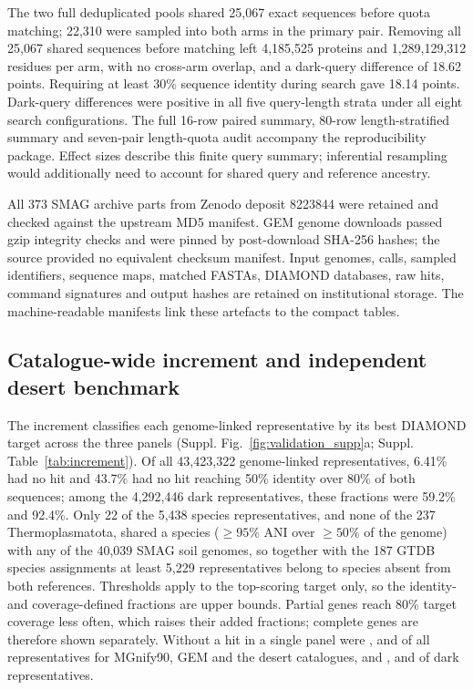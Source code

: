 The two full deduplicated pools shared 25{,}067 exact sequences before quota matching;
22{,}310 were sampled into both arms in the primary pair. Removing all 25{,}067 shared sequences
before matching left 4{,}185{,}525 proteins and 1{,}289{,}129{,}312 residues per arm, with no
cross-arm overlap, and a dark-query difference of 18.62 points. Requiring at least 30\%
sequence identity during search gave 18.14 points. Dark-query differences were positive in
all five query-length strata under all eight search configurations. The full 16-row paired
summary, 80-row length-stratified summary and seven-pair length-quota audit accompany the
reproducibility package. Effect sizes describe this finite query summary; inferential
resampling would additionally need to account for shared query and reference ancestry.

All 373 SMAG archive parts from Zenodo deposit 8223844 were retained and checked against the
upstream MD5 manifest. GEM genome downloads passed gzip integrity checks and were pinned by
post-download SHA-256 hashes; the source provided no equivalent checksum manifest.
Input genomes, calls, sampled identifiers, sequence maps, matched FASTAs, DIAMOND databases,
raw hits, command signatures and output hashes are retained on institutional storage. The machine-readable
manifests link these artefacts to the compact tables.

\subsection*{Catalogue-wide increment and independent desert benchmark}
The increment classifies each genome-linked representative by its best DIAMOND target across the three panels (Suppl. Fig.~\ref{fig:validation_supp}a; Suppl. Table~\ref{tab:increment}). Of all 43,423,322 genome-linked representatives, 6.41\% had no hit and 43.7\% had no hit reaching 50\% identity over 80\% of both sequences; among the 4,292,446 dark representatives, these fractions were 59.2\% and 92.4\%. Only 22 of the 5,438 species representatives, and none of the 237 Thermoplasmatota, shared a species ($\geq 95\%$ ANI over $\geq 50\%$ of the genome) with any of the 40,039 SMAG soil genomes, so together with the 187 GTDB species assignments at least 5,229 representatives belong to species absent from both references. Thresholds apply to the top-scoring target only, so the identity- and coverage-defined fractions are upper bounds. Partial genes reach 80\% target coverage less often, which raises their added fractions; complete genes are therefore shown separately. Without a hit in a single panel were ,  and  of all representatives for MGnify90, GEM and the desert catalogues, and ,  and  of dark representatives.


